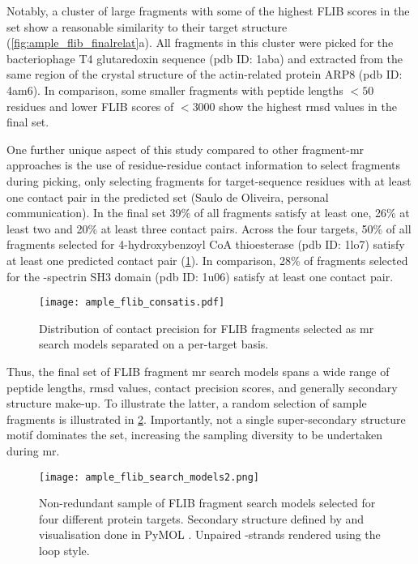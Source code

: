 Notably, a cluster of large fragments with some of the highest FLIB scores in the set show a reasonable similarity to their target structure (\cref{fig:ample_flib_finalrelat}a). All fragments in this cluster were picked for the bacteriophage T4 glutaredoxin sequence (\gls{pdb} ID: 1aba) and extracted from the same region of the crystal structure of the actin-related protein ARP8 (\gls{pdb} ID: 4am6). In comparison, some smaller fragments with peptide lengths $<50$ residues and lower FLIB scores of $<3000$ show the highest \gls{rmsd} values in the final set.

One further unique aspect of this study compared to other fragment-\gls{mr} approaches is the use of residue-residue contact information to select fragments during picking, only selecting fragments for target-sequence residues with at least one contact pair in the predicted set (Saulo de Oliveira, personal communication). In the final set 39\% of all fragments satisfy at least one, 26\% at least two and 20\% at least three contact pairs. Across the four targets, 50\% of all fragments selected for 4-hydroxybenzoyl CoA thioesterase (\gls{pdb} ID: 1lo7) satisfy at least one predicted contact pair (\cref{fig:ample_flib_consatis}). In comparison, 28\% of fragments selected for the \textalpha-spectrin SH3 domain (\gls{pdb} ID: 1u06) satisfy at least one contact pair.

\begin{figure}[H]
	\centering
	\texttt{[image: ample\_flib\_consatis.pdf]}
	\caption[Distribution of contact precision for FLIB fragments]{Distribution of contact precision for FLIB fragments selected as \gls{mr} search models separated on a per-target basis.}
	\label{fig:ample_flib_consatis}
\end{figure}

Thus, the final set of FLIB fragment \gls{mr} search models spans a wide range of peptide lengths, \gls{rmsd} values, contact precision scores, and generally secondary structure make-up. To illustrate the latter, a random selection of sample fragments is illustrated in \cref{fig:ample_flib_search_models}. Importantly, not a single super-secondary structure motif dominates the set, increasing the sampling diversity to be undertaken during \gls{mr}.

\begin{figure}[H]
	\centering
	\texttt{[image: ample\_flib\_search\_models2.png]}
	\caption[Fragment search models derived from FLIB]{Non-redundant sample of FLIB fragment search models selected for four different protein targets. Secondary structure defined by and visualisation done in PyMOL \cite{DeLano2002-hm}. Unpaired \textbeta-strands rendered using the loop style.}
	\label{fig:ample_flib_search_models}
\end{figure}

